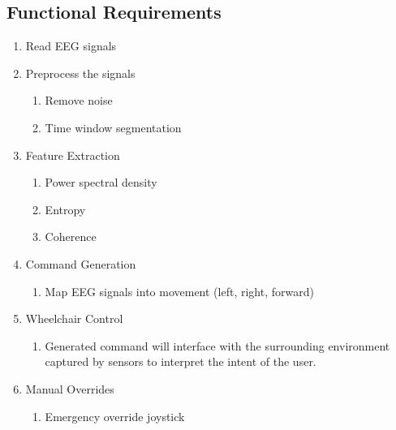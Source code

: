 \documentclass[conference]{IEEEtran}
\begin{document}
    \subsection{Functional Requirements}
    \begin{enumerate}
        \item Read EEG signals
        \item Preprocess the signals
        \begin{enumerate}
            \item Remove noise
            \item Time window segmentation
        \end{enumerate}
        \item Feature Extraction
        \begin{enumerate}
            \item Power spectral density
            \item Entropy
            \item Coherence
        \end{enumerate}
        \item Command Generation
        \begin{enumerate}
            \item Map EEG signals into movement (left, right, forward)
        \end{enumerate}
        \item Wheelchair Control
        \begin{enumerate}
            \item Generated command will interface with the surrounding environment captured by sensors to interpret the intent of the user.
        \end{enumerate}
        \item Manual Overrides
        \begin{enumerate}
            \item Emergency override joystick
        \end{enumerate}
    \end{enumerate}

    
\end{document}
